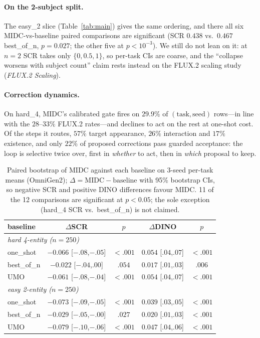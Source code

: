 \documentclass[letterpaper]{article}
\begin{document}
\paragraph{On the 2-subject split.} The easy\_2 slice (Table~\ref{tab:main}) gives the same ordering, and there all six MIDC-vs-baseline paired comparisons are significant (SCR $0.438$ vs.\ $0.467$ best\_of\_n, $p{=}0.027$; the other five at $p{<}10^{-3}$). We still do not lean on it: at $n{=}2$ SCR takes only $\{0,0.5,1\}$, so per-task CIs are coarse, and the ``collapse worsens with subject count'' claim rests instead on the FLUX.2 scaling study (\emph{FLUX.2 Scaling}).

\paragraph{Correction dynamics.} On hard\_4, MIDC's calibrated gate fires on $29.9\%$ of $(\text{task},\text{seed})$ rows---in line with the $28$--$33\%$ FLUX.2 rates---and declines to act on the rest at one-shot cost. Of the steps it routes, $57\%$ target appearance, $26\%$ interaction and $17\%$ existence, and only $22\%$ of proposed corrections pass guarded acceptance: the loop is selective twice over, first in \emph{whether} to act, then in \emph{which} proposal to keep.

\begin{table}[t]
\centering
\small
\setlength{\tabcolsep}{1.5pt}
\begin{tabular}{lcccc}
\toprule
baseline & $\Delta$SCR & $p$ & $\Delta$DINO & $p$ \\
\midrule
\multicolumn{5}{l}{\textit{hard 4-entity ($n{=}250$)}} \\
one\_shot & $-0.066$ [$-.08$,$-.05$] & $<.001$ & $0.054$ [$.04$,$.07$] & $<.001$ \\
best\_of\_n & $-0.022$ [$-.04$,$.00$] & $.054$ & $0.017$ [$.01$,$.03$] & $.006$ \\
UMO & $-0.061$ [$-.08$,$-.04$] & $<.001$ & $0.054$ [$.04$,$.07$] & $<.001$ \\
\multicolumn{5}{l}{\textit{easy 2-entity ($n{=}250$)}} \\
one\_shot & $-0.073$ [$-.09$,$-.05$] & $<.001$ & $0.039$ [$.03$,$.05$] & $<.001$ \\
best\_of\_n & $-0.029$ [$-.05$,$-.00$] & $.027$ & $0.020$ [$.01$,$.03$] & $<.001$ \\
UMO & $-0.079$ [$-.10$,$-.06$] & $<.001$ & $0.047$ [$.04$,$.06$] & $<.001$ \\
\bottomrule
\end{tabular}
\caption{Paired bootstrap of MIDC against each baseline on 3-seed per-task means (OmniGen2); $\Delta = \mathrm{MIDC} - \mathrm{baseline}$ with 95\% bootstrap CIs, so negative SCR and positive DINO differences favour MIDC. 11 of the 12 comparisons are significant at $p<0.05$; the sole exception (hard\_4 SCR vs.\ best\_of\_n) is not claimed.}
\label{tab:paired}
\end{table}
\end{document}
